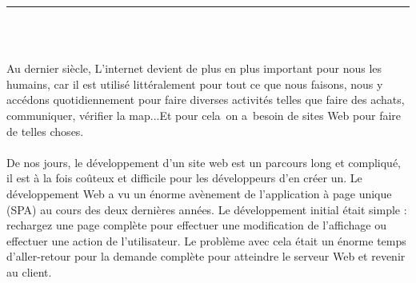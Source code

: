\documentclass[12pt]{report}
\begin{document}
\newpage

\listoftables



\newpage

\pagestyle{myfancy}

\vspace*{-0.2in}

\setcounter{page}{1}

\begin{center}
    {\color{Blue} \rule{6.2in}{1.4mm} }\\
    \vspace{0.1in}
    \scshape{\fontsize{34}{46}{\bfseries{\color{Blue}{Introduction générale}}}}
    \\
    \vspace{0.5in}
\end{center}
\hspace*{0.16in}
Au dernier siècle, L'internet devient de plus en plus important pour nous les humains, car il est utilisé littéralement pour tout ce que nous faisons, nous y accédons quotidiennement pour faire diverses activités telles que faire des achats, communiquer, vérifier la map...Et pour cela on a besoin de sites Web pour faire de telles choses.
\\\\
\hspace*{0.16in}
De nos jours, le développement d'un site web est un parcours long et compliqué, il est à la fois coûteux et difficile pour les développeurs d'en créer un. Le développement Web a vu un énorme avènement de l’application à page unique (SPA) au cours des deux dernières années. Le développement initial était simple : rechargez une page complète pour effectuer une modification de l’affichage ou effectuer une action de l’utilisateur. Le problème avec cela était un énorme temps d’aller-retour pour la demande complète pour atteindre le serveur Web et revenir au client.
\\\\
\hspace*{0.16in}
\end{document}
